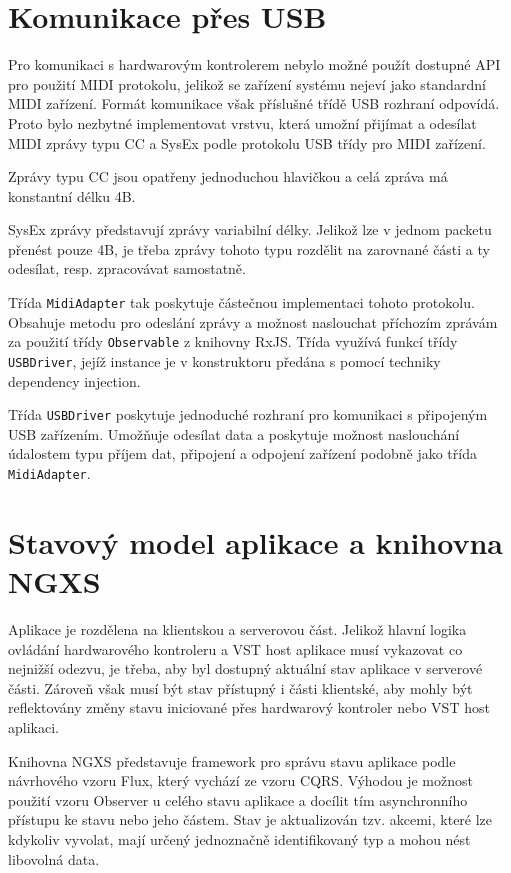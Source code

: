\documentclass[thesis=M,czech]{FITthesis}[2019/03/06]
\begin{document}
	\section{Komunikace přes USB}
		Pro komunikaci s hardwarovým kontrolerem nebylo možné použít dostupné API pro použití MIDI protokolu,
		jelikož se zařízení systému nejeví jako standardní MIDI zařízení. Formát komunikace však příslušné třídě USB rozhraní odpovídá.
		Proto bylo nezbytné implementovat vrstvu, která umožní přijímat a odesílat MIDI zprávy typu CC a SysEx
		podle protokolu USB třídy pro MIDI zařízení\cite{usbmidi}.
		
		Zprávy typu CC jsou opatřeny jednoduchou hlavičkou a celá zpráva má konstantní délku 4B.
		
		SysEx zprávy představují zprávy variabilní délky. Jelikož lze v jednom packetu přenést pouze 4B,
		je třeba zprávy tohoto typu rozdělit na zarovnané části a ty odesílat, resp. zpracovávat samostatně.
		
		Třída \texttt{MidiAdapter} tak poskytuje částečnou implementaci tohoto protokolu. 
		Obsahuje metodu pro odeslání zprávy a možnost naslouchat příchozím zprávám za použití třídy \texttt{Observable} z knihovny RxJS.		
		Třída využívá funkcí třídy \texttt{USBDriver}, jejíž instance je v konstruktoru předána s pomocí techniky dependency injection\cite{prasanna2009dependency}.
		
		Třída \texttt{USBDriver} poskytuje jednoduché rozhraní pro komunikaci s připojeným USB zařízením.
		Umožňuje odesílat data a poskytuje možnost naslouchání údalostem typu příjem dat, připojení a odpojení zařízení podobně jako třída \texttt{MidiAdapter}.

	\section{Stavový model aplikace a knihovna NGXS}\label{sec:NGXS}
		Aplikace je rozdělena na klientskou a serverovou část. Jelikož hlavní logika ovládání hardwarového kontroleru a VST host aplikace
		musí vykazovat co nejnižší odezvu, je třeba, aby byl dostupný aktuální stav aplikace v serverové části.
		Zároveň však musí být stav přístupný i části klientské, aby mohly být reflektovány změny stavu iniciované přes
		hardwarový kontroler nebo VST host aplikaci.

		Knihovna NGXS představuje framework pro správu stavu aplikace podle návrhového vzoru Flux\cite{flux}, který vychází ze vzoru CQRS\cite{flux-cqrs}. Výhodou je možnost použití vzoru Observer u celého stavu aplikace a docílit tím asynchronního
		přístupu ke stavu nebo jeho částem\cite{mansilla2018reactive}. Stav je aktualizován tzv. akcemi, které lze kdykoliv vyvolat,
		mají určený jednoznačně identifikovaný typ a mohou nést libovolná data.
		
\end{document}
